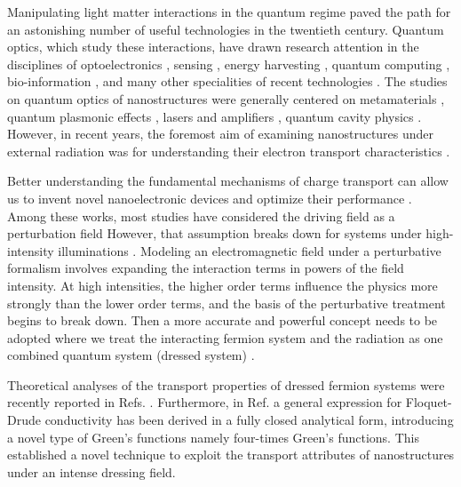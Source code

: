 
Manipulating light matter interactions in the quantum regime paved the path for an astonishing number of useful technologies in the twentieth century. Quantum optics, which study these interactions, have drawn research attention in the disciplines of optoelectronics \cite{liu16,wijesekara20,tao21}, sensing \cite{rodrigo2015,pirandola18,hapuarachchi2018}, energy harvesting \cite{yuan16,sun18},
quantum computing \cite{huh15,slussarenko19,andersen21}, bio-information \cite{marais18,bian20}, and many other specialities of recent technologies \cite{rivera20}.
The studies on quantum optics of nanostructures were generally centered on metamaterials \cite{shalaev07,si14}, quantum plasmonic effects \cite{hapuarachchi19,perera20}, lasers and amplifiers \cite{zhang05,chow13}, quantum cavity physics \cite{tsang10,devi20}.
However, in recent years, the foremost aim of examining nanostructures under external radiation was for understanding their electron transport characteristics \cite{kitagawa11,zhou11,kibis14,pervishko15,morina15,dehghani15,dini16,wackerl20}.

Better understanding the fundamental mechanisms of charge transport can allow us to invent novel nanoelectronic devices and optimize their performance \cite{premaratne21}.
Among these works, most studies have considered the driving field as a perturbation field \cite{pervishko15,morina15} However, that assumption breaks down for systems under high-intensity illuminations \cite{grifoni98,wackerl20}.
Modeling an electromagnetic field under a perturbative formalism involves expanding the interaction terms in powers of the field intensity. At high intensities, the higher order terms influence the physics more strongly than the lower order terms, and the basis of the perturbative treatment begins to break down.
Then a more accurate and powerful concept needs to be adopted where we treat  the interacting fermion system and the radiation as one combined quantum system (dressed system) \cite{morina15,cohen98,scully01}.

Theoretical analyses of the transport properties of dressed fermion systems were recently reported in Refs. \cite{kibis14,morina15,wackerl20}.
Furthermore, in Ref. \cite{wackerl20} a general expression for Floquet-Drude conductivity has been derived in a fully closed analytical form, introducing a novel type of Green’s functions namely four-times Green’s functions. This established a novel technique to exploit the transport attributes of nanostructures under an intense dressing field.

